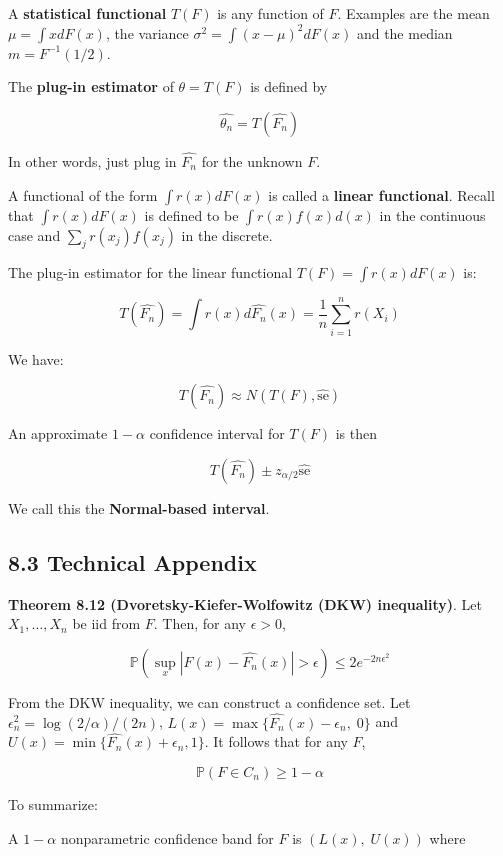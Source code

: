 A \textbf{statistical functional} \(T(F)\) is any function of \(F\).
Examples are the mean \(\mu = \int x dF(x)\), the variance
\(\sigma^2 = \int (x - \mu)^2 dF(x)\) and the median
\(m = F^{-1}(1/2)\).

The \textbf{plug-in estimator} of \(\theta = T(F)\) is defined by

\[\hat{\theta_n} = T(\hat{F_n}) \]

In other words, just plug in \(\hat{F_n}\) for the unknown \(F\).

A functional of the form \(\int r(x) dF(x)\) is called a \textbf{linear
functional}. Recall that \(\int r(x) dF(x)\) is defined to be
\(\int r(x) f(x) d(x)\) in the continuous case and
\(\sum_j r(x_j) f(x_j)\) in the discrete.

The plug-in estimator for the linear functional
\(T(F) = \int r(x) dF(x)\) is:

\[T(\hat{F_n}) = \int r(x) d\hat{F_n}(x) = \frac{1}{n} \sum_{i=1}^n r(X_i)\]

We have:

\[ T(\hat{F_n}) \approx N\left(T(F), \hat{\text{se}}\right) \]

An approximate \(1 - \alpha\) confidence interval for \(T(F)\) is then

\[ T(\hat{F_n}) \pm z_{\alpha/2} \hat{\text{se}} \]

We call this the \textbf{Normal-based interval}.

\subsection{8.3 Technical Appendix}\label{technical-appendix}

\textbf{Theorem 8.12 (Dvoretsky-Kiefer-Wolfowitz (DKW) inequality)}. Let
\(X_1, \dots, X_n\) be iid from \(F\). Then, for any \(\epsilon > 0\),

\[\mathbb{P}\left( \sup_x |F(x) - \hat{F_n}(x) | > \epsilon \right) \leq 2 e^{-2n\epsilon^2}\]

From the DKW inequality, we can construct a confidence set. Let
\(\epsilon_n^2 = \log(2/\alpha) / (2n)\),
\(L(x) = \max \{ \hat{F_n}(x) - \epsilon_n, \; 0 \}\) and
\(U(x) = \min \{\hat{F_n}(x) + \epsilon_n, 1 \}\). It follows that for
any \(F\),

\[ \mathbb{P}(F \in C_n) \geq 1 - \alpha \]

To summarize:

A \(1 - \alpha\) nonparametric confidence band for \(F\) is
\((L(x), \; U(x))\) where

